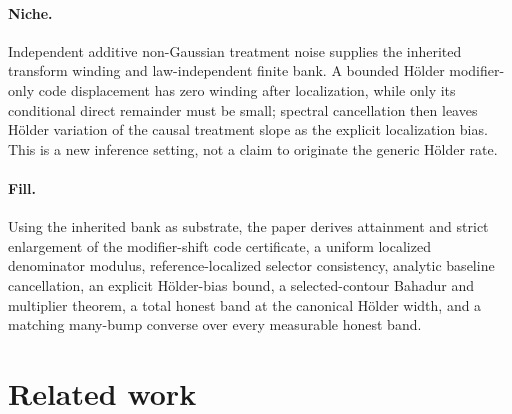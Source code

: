 \documentclass{article}
\begin{document}
\paragraph{Niche.} Independent additive non-Gaussian treatment noise supplies the inherited transform winding and law-independent finite bank. A bounded Hölder modifier-only code displacement has zero winding after localization, while only its conditional direct remainder must be small; spectral cancellation then leaves Hölder variation of the causal treatment slope as the explicit localization bias. This is a new inference setting, not a claim to originate the generic Hölder rate.

\paragraph{Fill.} Using the inherited bank as substrate, the paper derives attainment and strict enlargement of the modifier-shift code certificate, a uniform localized denominator modulus, reference-localized selector consistency, analytic baseline cancellation, an explicit Hölder-bias bound, a selected-contour Bahadur and multiplier theorem, a total honest band at the canonical Hölder width, and a matching many-bump converse over every measurable honest band.

\section{Related work}
\end{document}
